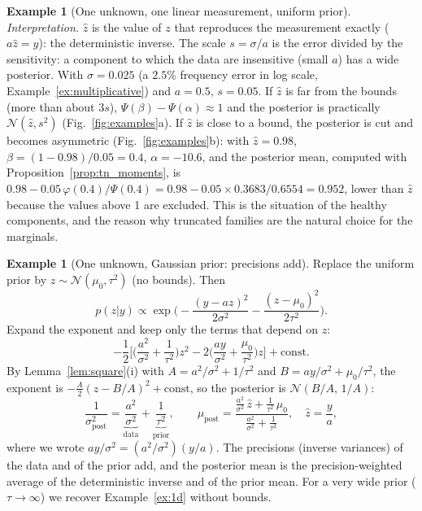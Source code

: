 \documentclass[11pt,a4paper]{article}
\numberwithin{equation}{section}
\theoremstyle{plain}
\theoremstyle{definition}
\newtheorem{example}[proposition]{Example}
\theoremstyle{remark}
\newcommand{\N}{\mathcal{N}}
\begin{document}
\begin{example}[One unknown, one linear measurement, uniform prior]
\emph{Interpretation.} $\hat z$ is the value of $z$ that reproduces the measurement exactly ($a\hat z=y$): the deterministic inverse. The scale $s=\sigma/a$ is the error divided by the sensitivity: a component to which the data are insensitive (small $a$) has a wide posterior.
With $\sigma=0.025$ (a $2.5\%$ frequency error in log scale, Example~\ref{ex:multiplicative}) and $a=0.5$, $s=0.05$.
If $\hat z$ is far from the bounds (more than about $3s$), $\Psi(\beta)-\Psi(\alpha)\approx1$ and the posterior is practically $\N(\hat z,s^2)$ (Fig.~\ref{fig:examples}a). If $\hat z$ is close to a bound, the posterior is cut and becomes asymmetric (Fig.~\ref{fig:examples}b): with $\hat z=0.98$, $\beta=(1-0.98)/0.05=0.4$, $\alpha=-10.6$, and the posterior mean, computed with Proposition~\ref{prop:tn_moments}, is $0.98-0.05\,\varphi(0.4)/\Psi(0.4)=0.98-0.05\times0.3683/0.6554=0.952$, lower than $\hat z$ because the values above 1 are excluded.
This is the situation of the healthy components, and the reason why truncated families are the natural choice for the marginals.
\end{example}

\begin{example}[One unknown, Gaussian prior: precisions add]
\label{ex:conjugate}
Replace the uniform prior by $z\sim\N(\mu_0,\tau^2)$ (no bounds). Then
\begin{equation*}
p(z|y)\propto\exp\Big(-\frac{(y-az)^2}{2\sigma^2}-\frac{(z-\mu_0)^2}{2\tau^2}\Big).
\end{equation*}
Expand the exponent and keep only the terms that depend on $z$:
\begin{equation*}
-\frac12\Big[\Big(\frac{a^2}{\sigma^2}+\frac1{\tau^2}\Big)z^2-2\Big(\frac{ay}{\sigma^2}+\frac{\mu_0}{\tau^2}\Big)z\Big]+\text{const}.
\end{equation*}
By Lemma~\ref{lem:square}(i) with $A=a^2/\sigma^2+1/\tau^2$ and $B=ay/\sigma^2+\mu_0/\tau^2$, the exponent is $-\frac A2(z-B/A)^2+\text{const}$, so the posterior is $\N(B/A,\,1/A)$:
\begin{equation*}
\frac{1}{\sigma_{\text{post}}^2}=\underbrace{\frac{a^2}{\sigma^2}}_{\text{data}}+\underbrace{\frac{1}{\tau^2}}_{\text{prior}},\qquad
\mu_{\text{post}}=\frac{\frac{a^2}{\sigma^2}\,\hat z+\frac1{\tau^2}\,\mu_0}{\frac{a^2}{\sigma^2}+\frac1{\tau^2}},\quad\hat z=\frac ya,
\end{equation*}
where we wrote $ay/\sigma^2=(a^2/\sigma^2)(y/a)$. The precisions (inverse variances) of the data and of the prior add, and the posterior mean is the precision-weighted average of the deterministic inverse and of the prior mean. For a very wide prior ($\tau\to\infty$) we recover Example~\ref{ex:1d} without bounds.
\end{example}
\end{document}
